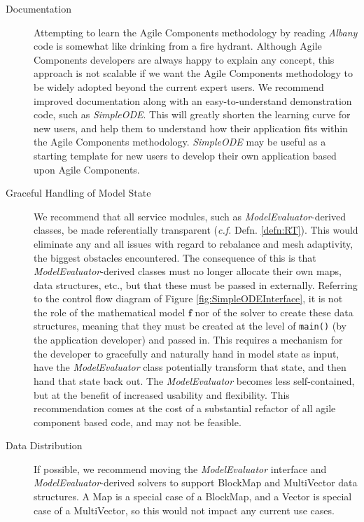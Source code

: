 \documentclass[pdf,ps2pdf,12pt,report]{SANDreport}
\theoremstyle{plain}
\theoremstyle{definition}
\theoremstyle{remark}
\numberwithin{equation}{section}
\begin{document}
\begin{description}
  \item[Documentation] Attempting to learn the Agile Components methodology by reading \emph{Albany} code is somewhat like drinking from a fire hydrant. Although Agile Components developers are always happy to explain any concept, this approach is not scalable if we want the Agile Components methodology to be widely adopted beyond the current expert users. We recommend improved documentation along with an easy-to-understand demonstration code, such as \emph{SimpleODE}. This will greatly shorten the learning curve for new users, and help them to understand how their application fits within the Agile Components methodology. \emph{SimpleODE} may be useful as a starting template for new users to develop their own application based upon Agile Components.
  \item[Graceful Handling of Model State] We recommend that all service modules, such as \emph{ModelEvaluator}-derived classes, be made referentially transparent (\emph{c.f.} Defn. \ref{defn:RT}). This would eliminate any and all issues with regard to rebalance and mesh adaptivity, the biggest obstacles encountered. The consequence of this is that \emph{ModelEvaluator}-derived classes must no longer allocate their own maps, data structures, etc., but that these must be passed in externally. Referring to the control flow diagram of Figure \ref{fig:SimpleODEInterface}, it is not the role of the mathematical model $\mathbf{f}$ nor of the solver to create these data structures, meaning that they must be created at the level of \verb"main()" (by the application developer) and passed in. This requires a mechanism for the developer to gracefully and naturally hand in model state as input, have the \emph{ModelEvaluator} class potentially transform that state, and then hand that state back out. The \emph{ModelEvaluator} becomes less self-contained, but at the benefit of increased usability and flexibility. This recommendation comes at the cost of a substantial refactor of all agile component based code, and may not be feasible.
  \item[Data Distribution] If possible, we recommend moving the \emph{ModelEvaluator} interface and \emph{ModelEvaluator}-derived solvers to support BlockMap and MultiVector data structures. A Map is a special case of a BlockMap, and a Vector is special case of a MultiVector, so this would not impact any current use cases.

\end{description}
\end{document}
